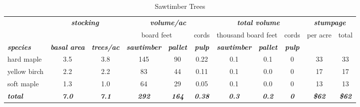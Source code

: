 \documentclass[landscape]{article}
\begin{document}
\begin{table}[H]

\caption{\label{tab:unnamed-chunk-40}Sawtimber Trees}
\fontsize{10}{12}\selectfont
\begin{tabular}[t]{lcccccccccc}
\toprule
\multicolumn{1}{c}{\em{\textbf{ }}} & \multicolumn{2}{c}{\em{\textbf{stocking}}} & \multicolumn{3}{c}{\em{\textbf{volume/ac }}} & \multicolumn{3}{c}{\em{\textbf{total volume}}} & \multicolumn{2}{c}{\em{\textbf{stumpage}}} \\
\cmidrule(l{3pt}r{3pt}){2-3} \cmidrule(l{3pt}r{3pt}){4-6} \cmidrule(l{3pt}r{3pt}){7-9} \cmidrule(l{3pt}r{3pt}){10-11}
\multicolumn{3}{c}{ } & \multicolumn{2}{c}{board feet} & \multicolumn{1}{c}{cords} & \multicolumn{2}{c}{thousand board feet} & \multicolumn{1}{c}{cords} & \multicolumn{1}{c}{per acre} & \multicolumn{1}{c}{total} \\
\cmidrule(l{3pt}r{3pt}){4-5} \cmidrule(l{3pt}r{3pt}){6-6} \cmidrule(l{3pt}r{3pt}){7-8} \cmidrule(l{3pt}r{3pt}){9-9} \cmidrule(l{3pt}r{3pt}){10-10} \cmidrule(l{3pt}r{3pt}){11-11}
\rowcolor[HTML]{DCDCDC}  \em{\textbf{species}} & \em{\textbf{basal area}} & \em{\textbf{trees/ac}} & \em{\textbf{sawtimber}} & \em{\textbf{pallet}} & \em{\textbf{pulp}} & \em{\textbf{sawtimber}} & \em{\textbf{pallet}} & \em{\textbf{pulp}} & \em{\textbf{ }} & \em{\textbf{ }}\\
\midrule
\rowcolor{gray!6}  hard maple & 3.5 & 3.8 & 145 & 90 & 0.22 & 0.1 & 0.1 & 0 & 33 & 33\\
 
yellow birch & 2.2 & 2.2 & 83 & 44 & 0.11 & 0.1 & 0.0 & 0 & 17 & 17\\
 
\rowcolor{gray!6}  soft maple & 1.3 & 1.0 & 64 & 29 & 0.05 & 0.1 & 0.0 & 0 & 13 & 13\\
 
\rowcolor[HTML]{DCDCDC}  \em{\textbf{total}} & \em{\textbf{7.0}} & \em{\textbf{7.1}} & \em{\textbf{292}} & \em{\textbf{164}} & \em{\textbf{0.38}} & \em{\textbf{0.3}} & \em{\textbf{0.2}} & \em{\textbf{0}} & \em{\textbf{\$62}} & \em{\textbf{\$62}}\\
\bottomrule
\end{tabular}
\end{table}
\end{document}

